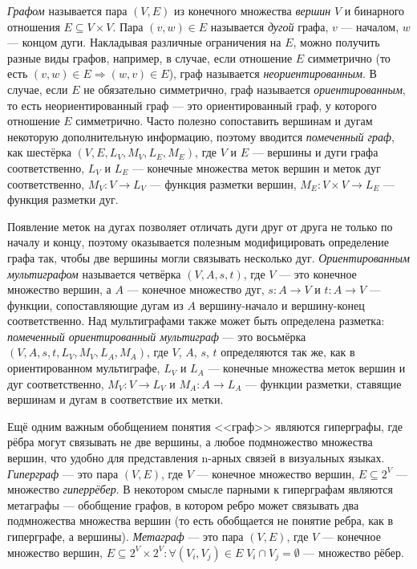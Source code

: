 \textit{Графом} называется пара $(V, E)$ из конечного множества \textit{вершин} $V$ и бинарного
отношения $E \subseteq V \times V$. Пара $(v, w) \in E$ называется \textit{дугой} графа, 
$v$ --- началом, $w$ --- концом дуги. Накладывая различные ограничения на $E$, можно 
получить разные виды графов, например, в случае, если отношение $E$ симметрично 
(то есть $(v, w) \in E \Rightarrow (w, v) \in E$), граф называется \textit{неориентированным}.
В случае, если $E$ не обязательно симметрично, граф называется \textit{ориентированным}, то есть
неориентированный граф --- это ориентированный граф, у которого отношение $E$ симметрично. 
Часто полезно сопоставить вершинам и дугам некоторую дополнительную информацию, поэтому 
вводится \textit{помеченный граф}, как шестёрка $(V, E, L_V, M_V, L_E, M_E)$, где 
$V$ и $E$ --- вершины и дуги графа соответственно, $L_V$ и $L_E$ --- конечные множества меток 
вершин и меток дуг соответственно, $M_V: V \rightarrow L_V$ --- функция разметки вершин, 
$M_E: V \times V \rightarrow L_E$ --- функция разметки дуг.

Появление меток на дугах позволяет отличать дуги друг от друга не только по началу и концу,
поэтому оказывается полезным модифицировать определение графа так, чтобы две вершины могли связывать
несколько дуг. \textit{Ориентированным мультиграфом} называется четвёрка $(V, A, s, t)$, 
где $V$ --- это конечное множество вершин, а $A$ --- конечное множество дуг, 
$s : A \rightarrow V$ и $t : A \rightarrow V$ --- функции, сопоставляющие дугам из $A$ 
вершину-начало и вершину-конец соответственно. Над мультиграфами также может быть
определена разметка: \textit{помеченный ориентированный мультиграф} --- это восьмёрка
$(V, A, s, t, L_V, M_V, L_A, M_A)$, где $V$, $A$, $s$, $t$ определяются так же, как 
в ориентированном мультиграфе, $L_V$ и $L_A$ --- конечные множества меток вершин и дуг
соответственно, $M_V: V \rightarrow L_V$ и $M_A: A \rightarrow L_A$ --- функции разметки,
ставящие вершинам и дугам в соответствие их метки.

Ещё одним важным обобщением понятия <<граф>> являются гиперграфы, где рёбра могут связывать
не две вершины, а любое подмножество множества вершин,  что удобно для представления 
n-арных связей в визуальных языках. \textit{Гиперграф} --- это пара $(V, E)$, где
$V$ --- конечное множество вершин, $E \subseteq 2^V$ --- множество \textit{гиперрёбер}.
В некотором смысле парными к гиперграфам являются метаграфы --- обобщение графов, в
котором ребро может связывать два подмножества множества вершин (то есть обобщается
не понятие ребра, как в гиперграфе, а вершины). \textit{Метаграф} --- это пара $(V, E)$, где
$V$ --- конечное множество вершин, $E \subseteq 2^V \times 2^V : \forall (V_i, V_j) \in E \; V_i \cap V_j = \emptyset$ 
--- множество рёбер. 

